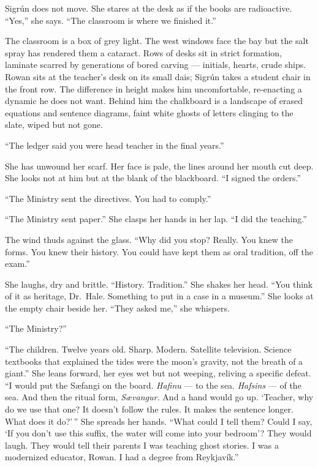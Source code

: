 \documentclass[11pt,oneside]{book}
\newcommand{\sceneline}{%
  \par\vspace{1.2em}
  \begin{center}
    \fontsize{11}{11}\selectfont \textbullet\quad\textbullet\quad\textbullet
  \end{center}
  \vspace{0.6em}\noindent\ignorespaces
}
\begin{document}
Sigrún does not move. She stares at the desk as if the books are
radioactive. ``Yes,'' she says. ``The classroom is where we finished
it.''

\sceneline

The classroom is a box of grey light. The west windows face the bay but
the salt spray has rendered them a cataract. Rows of desks sit in strict
formation, laminate scarred by generations of bored carving ---
initials, hearts, crude ships. Rowan sits at the teacher's desk on its
small dais; Sigrún takes a student chair in the front row. The
difference in height makes him uncomfortable, re-enacting a dynamic he
does not want. Behind him the chalkboard is a landscape of erased
equations and sentence diagrams, faint white ghosts of letters clinging
to the slate, wiped but not gone.

``The ledger said you were head teacher in the final years.''

She has unwound her scarf. Her face is pale, the lines around her mouth
cut deep. She looks not at him but at the blank of the blackboard. ``I
signed the orders.''

``The Ministry sent the directives. You had to comply.''

``The Ministry sent paper.'' She clasps her hands in her lap. ``I did
the teaching.''

The wind thuds against the glass. ``Why did you stop? Really. You knew
the forms. You knew their history. You could have kept them as oral
tradition, off the exam.''

She laughs, dry and brittle. ``History. Tradition.'' She shakes her
head. ``You think of it as heritage, Dr.~Hale. Something to put in a
case in a museum.'' She looks at the empty chair beside her. ``They
asked me,'' she whispers.

``The Ministry?''

``The children. Twelve years old. Sharp. Modern. Satellite television.
Science textbooks that explained the tides were the moon's gravity, not
the breath of a giant.'' She leans forward, her eyes wet but not
weeping, reliving a specific defeat. ``I would put the Sæfangi on the
board. \emph{Hafinu} --- to the sea. \emph{Hafsins} --- of the sea. And
then the ritual form, \emph{Sævangur.} And a hand would go up. `Teacher,
why do we use that one? It doesn't follow the rules. It makes the
sentence longer. What does it do?'\,'' She spreads her hands. ``What
could I tell them? Could I say, `If you don't use this suffix, the water
will come into your bedroom'? They would laugh. They would tell their
parents I was teaching ghost stories. I was a modernized educator,
Rowan. I had a degree from Reykjavík.''
\end{document}
